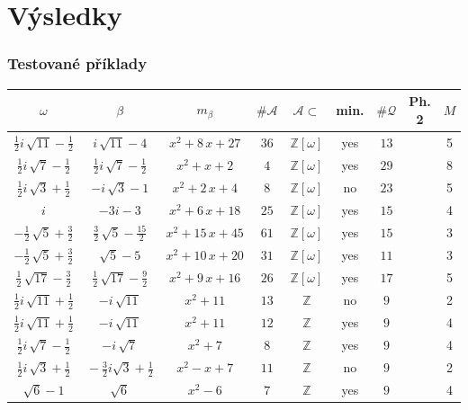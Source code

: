 \documentclass[11pt]{beamer}
\newcommand{\Zomega}{\mathbb{Z}[\omega]}
\newcommand{\ZZ}{\mathbb{Z}}
\newcommand{\A}{\mathcal{A}}
\newcommand{\Q}{\mathcal{Q}}
\renewcommand\checkmark{\ding{51}}
\begin{document}
\section{Výsledky}
\begin{frame}
\fontsize{8pt}{10}\selectfont
    \frametitle{Testované příklady}
    \begin{tabular}{c|cc| cc c| c| c c }
$\omega$ & $\beta$ & $m_\beta$  & $\#\A$ & $\A\subset$ & min. & $\#\Q$ &  Ph. 2 & $M$   \\ \hline
 $ \frac{1}{2} i \, \sqrt{11} - \frac{1}{2} $ & $ i \, \sqrt{11} - 4 $ & $ x^{2} + 8 \, x + 27 $  & $ 36 $ & $\Zomega$ & yes & $ 13 $ & \checkmark & 5 \\
 $ \frac{1}{2} i \, \sqrt{7} - \frac{1}{2} $ & $ \frac{1}{2} i \, \sqrt{7} - \frac{1}{2} $ & $ x^{2} + x + 2 $ & $ 4 $ & $\Zomega$ & yes & $ 29 $ & \checkmark & 8 \\
 $ \frac{1}{2} i \, \sqrt{3} + \frac{1}{2} $ & $ -i \, \sqrt{3} - 1 $ & $ x^{2} + 2 \, x + 4 $  & $ 8 $ &  $\Zomega$ & no & $ 23 $ & \checkmark & 5 \\
 $ i $ & $ -3 i - 3 $ & $ x^{2} + 6 \, x + 18 $  & $ 25 $ & $\Zomega$ & yes & $ 15 $ & \checkmark & 4 \\
 $ -\frac{1}{2} \, \sqrt{5} + \frac{3}{2} $ & $ \frac{3}{2} \, \sqrt{5} - \frac{15}{2} $ & $ x^{2} + 15 \, x + 45 $  & $ 61 $ & $\Zomega$ & yes & $ 15 $ & \checkmark & 3 \\
 $ -\frac{1}{2} \, \sqrt{5} + \frac{3}{2} $ & $ \sqrt{5} - 5 $ & $ x^{2} + 10 \, x + 20 $  & $ 31 $ & $\Zomega$ & yes & $ 11 $ & \checkmark & 3 \\
 $ \frac{1}{2} \, \sqrt{17} - \frac{3}{2} $ & $ \frac{1}{2} \, \sqrt{17} - \frac{9}{2} $ & $ x^{2} + 9 \, x + 16 $  & $ 26 $ & $\Zomega$ & yes & $ 17 $ & \checkmark & 5 \\
$ \frac{1}{2} i \, \sqrt{11} + \frac{1}{2} $ & $ -i \, \sqrt{11} $ & $ x^{2} + 11 $  & $ 13 $ & $\ZZ$ & no & $ 9 $ & \checkmark & 2 \\
$ \frac{1}{2} i \, \sqrt{11} + \frac{1}{2} $ & $ -i \, \sqrt{11} $ & $ x^{2} + 11 $  & $ 12 $ & $\ZZ$ & yes & $ 9 $ & \checkmark & 4 \\
$ \frac{1}{2} i \, \sqrt{7} - \frac{1}{2} $ & $ -i \, \sqrt{7} $ & $ x^{2} + 7 $  & $ 8 $ & $\ZZ$ & yes & $ 9 $ & \checkmark & 4   \\
$ \frac{1}{2} i \, \sqrt{3} + \frac{1}{2} $ & $\! -\frac{3}{2} i \sqrt{3} + \frac{1}{2}\!$ & $\! x^{2} - x + 7 \!\!$ & $ 11 $ & $\ZZ$ & no & $ 9 $ & \checkmark & 2  \\
$ \sqrt{6} - 1 $ & $ \sqrt{6} $ & $ x^{2} - 6 $  & $ 7 $ & $\ZZ$ & yes & $ 9 $ & \checkmark & 4 \\

\end{tabular}
\end{frame}
\end{document}
